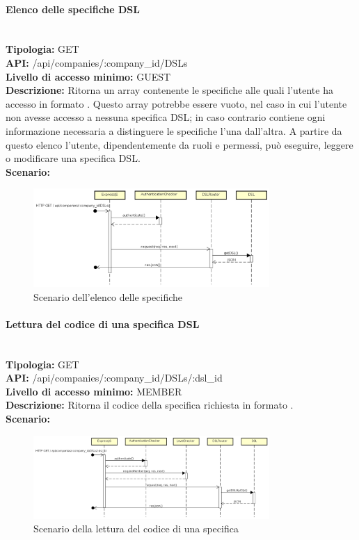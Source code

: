 \paragraph{Elenco delle specifiche DSL}\mbox{}\\
\textbf{Tipologia:} GET \\
\textbf{API:} /api/companies/:company\_id/DSLs \\
\textbf{Livello di accesso minimo:} GUEST \\
\textbf{Descrizione:} Ritorna un array contenente le specifiche  alle quali l'utente ha accesso in formato . Questo array potrebbe essere vuoto, nel caso in cui l'utente non avesse accesso a nessuna specifica DSL; in caso contrario contiene ogni informazione necessaria a distinguere le specifiche l'una dall'altra. A partire da questo elenco l'utente, dipendentemente da ruoli e permessi, può eseguire, leggere o modificare una specifica DSL. \\
\textbf{Scenario:} 
\begin{figure}[H]
\centering
\includegraphics[width=0.8\textwidth]{res/sections/backend/sequence/(GET)dsl.png}
\caption{Scenario dell'elenco delle specifiche }
\end{figure}

\newpage
\paragraph{Lettura del codice di una specifica DSL}\mbox{}\\
\textbf{Tipologia:} GET \\
\textbf{API:} /api/companies/:company\_id/DSLs/:dsl\_id \\
\textbf{Livello di accesso minimo:} MEMBER \\
\textbf{Descrizione:} Ritorna il codice della specifica  richiesta in formato . \\
\textbf{Scenario:} 
\begin{figure}[H]
\centering
\includegraphics[width=0.8\textwidth]{res/sections/backend/sequence/(GET)dslByID.png}
\caption{Scenario della lettura del codice di una specifica }
\end{figure}


